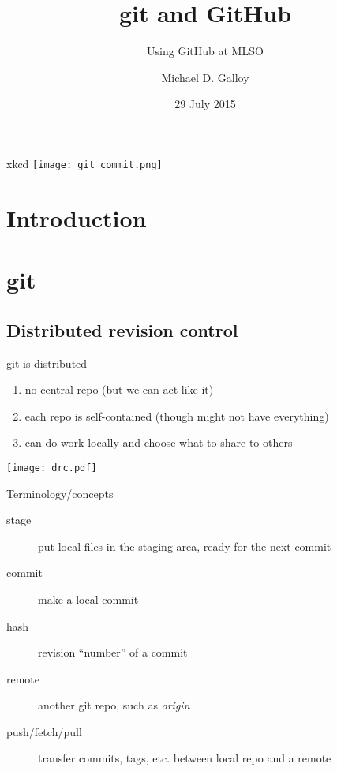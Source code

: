 \documentclass{beamer}
\title{git and GitHub}
\subtitle{Using GitHub at MLSO}
\author{Michael D. Galloy}
\institute[NCAR/MLSO]{NCAR/HAO --- MLSO}
\date{29 July 2015}
\begin{document}
\begin{frame}{xkcd}
  \texttt{[image: git\_commit.png]}
\end{frame}

\begin{frame}[plain]
  \titlepage
\end{frame}


\section{Introduction}
\subsection*{}

\begin{frame}
  \tableofcontents
\end{frame}


\section{git}

\subsection{Distributed revision control}
\begin{frame}{git is distributed}
  \begin{enumerate}
    \item no central repo (but we can act like it)
    \item each repo is self-contained (though might not have everything)
    \item can do work locally and choose what to share to others
  \end{enumerate}
  \begin{center}
    \texttt{[image: drc.pdf]}
  \end{center}
\end{frame}

\begin{frame}{Terminology/concepts}
  \begin{description}
    \item[stage] put local files in the staging area, ready for the next commit
    \item[commit] make a local commit
    \item[hash] revision ``number'' of a commit
    \item[remote] another git repo, such as {\em origin}
    \item[push/fetch/pull] transfer commits, tags, etc. between local repo and a remote
  \end{description}
\end{frame}
\end{document}
